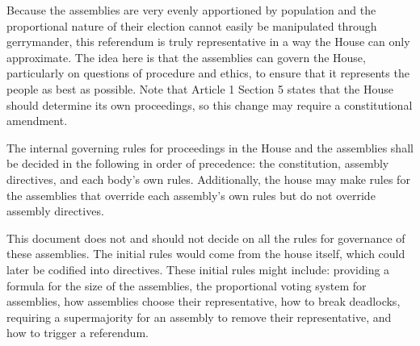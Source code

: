 \documentclass{article}
\begin{document}
Because the assemblies are very evenly apportioned by population and the proportional nature of their election cannot easily be manipulated through gerrymander, this referendum is truly representative in a way the House can only approximate. The idea here is that the assemblies can govern the House, particularly on questions of procedure and ethics, to ensure that it represents the people as best as possible. Note that Article 1 Section 5 states that the House should determine its own proceedings, so this change may require a constitutional amendment.

\begin{quoting}
The internal governing rules for proceedings in the House and the assemblies shall be decided in the following in order of precedence: the constitution, assembly directives, and each body’s own rules. Additionally, the house may make rules for the assemblies that override each assembly’s own rules but do not override assembly directives.
\end{quoting}

This document does not and should not decide on all the rules for governance of these assemblies. The initial rules would come from the house itself, which could later be codified into directives. These initial rules might include: providing a formula for the size of the assemblies, the proportional voting system for assemblies, how assemblies choose their representative, how to break deadlocks, requiring a supermajority for an assembly to remove their representative, and how to trigger a referendum.
\end{document}
